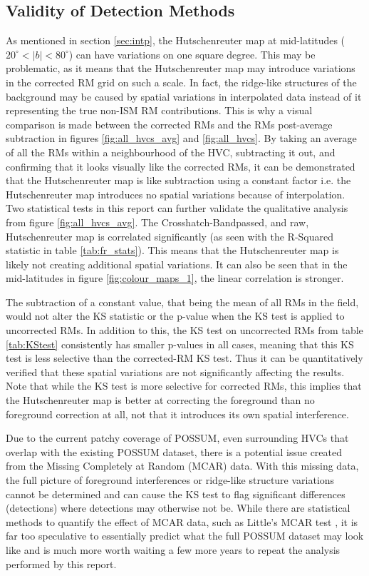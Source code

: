 \subsection{Validity of Detection Methods}
\label{ssec:B5}

As mentioned in section \ref{sec:intp}, the Hutschenreuter map at mid-latitudes ($20^\circ<|b|<80^\circ$) can have variations on one square degree. This may be problematic, as it means that the Hutschenreuter map may introduce variations in the corrected RM grid on such a scale. In fact, the ridge-like structures of the background may be caused by spatial variations in interpolated data instead of it representing the true non-ISM RM contributions. This is why a visual comparison is made between the corrected RMs and the RMs post-average subtraction in figures \ref{fig:all_hvcs_avg} and \ref{fig:all_hvcs}. By taking an average of all the RMs within a neighbourhood of the HVC, subtracting it out, and confirming that it looks visually like the corrected RMs, it can be demonstrated that the Hutschenreuter map is like subtraction using a constant factor i.e. the Hutschenreuter map introduces no spatial variations because of interpolation. Two statistical tests in this report can further validate the qualitative analysis from figure \ref{fig:all_hvcs_avg}. The Crosshatch-Bandpassed, and raw, Hutschenreuter map is correlated significantly (as seen with the R-Squared statistic in table \ref{tab:fr_stats}). This means that the Hutschenreuter map is likely not creating additional spatial variations. It can also be seen that in the mid-latitudes in figure \ref{fig:colour_maps_1}, the linear correlation is stronger.


The subtraction of a constant value, that being the mean of all RMs in the field, would not alter the KS statistic or the p-value when the KS test is applied to uncorrected RMs. In addition to this, the KS test on uncorrected RMs from table \ref{tab:KStest} consistently has smaller p-values in all cases, meaning that this KS test is less selective than the corrected-RM KS test. Thus it can be quantitatively verified that these spatial variations are not significantly affecting the results. Note that while the KS test is more selective for corrected RMs, this implies that the Hutschenreuter map is better at correcting the foreground than no foreground correction at all, not that it introduces its own spatial interference.


Due to the current patchy coverage of POSSUM, even surrounding HVCs that overlap with the existing POSSUM dataset, there is a potential issue created from the Missing Completely at Random (MCAR) data. With this missing data, the full picture of foreground interferences or ridge-like structure variations cannot be determined and can cause the KS test to flag significant differences (detections) where detections may otherwise not be. While there are statistical methods to quantify the effect of MCAR data, such as Little's MCAR test \citep{ID72}, it is far too speculative to essentially predict what the full POSSUM dataset may look like and is much more worth waiting a few more years to repeat the analysis performed by this report.


